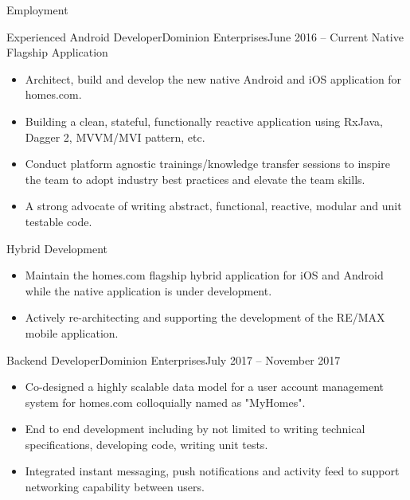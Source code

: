 \documentclass{mcdowellcv}
\begin{document}
	\makeheader
	
	\begin{cvsection}{Employment}
		\begin{cvsubsection}{Experienced Android Developer}{Dominion Enterprises}{June 2016 -- Current}
			Native Flagship Application
			\begin{itemize}
				\item Architect, build and develop the new native Android and iOS application for homes.com.
				\item Building a clean, stateful, functionally reactive application using RxJava, Dagger 2, MVVM/MVI pattern, etc.
				\item Conduct platform agnostic trainings/knowledge transfer sessions to inspire the team to adopt industry best practices and elevate the team skills.
				\item A strong advocate of writing abstract, functional, reactive, modular and unit testable code.
			\end{itemize}

			Hybrid Development
			\begin{itemize}
				\item Maintain the homes.com flagship hybrid application for iOS and Android while the native application is under development.
				\item Actively re-architecting and supporting the development of the RE/MAX mobile application.
			\end{itemize}
		\end{cvsubsection}
		
		\begin{cvsubsection}{Backend Developer}{Dominion Enterprises}{July 2017 -- November 2017}	
			\begin{itemize}
				\item Co-designed a highly scalable data model for a user account management system for homes.com colloquially named as "MyHomes".
				\item End to end development including by not limited to writing technical specifications, developing code, writing unit tests.
				\item Integrated instant messaging, push notifications and activity feed to support networking capability between users.
			\end{itemize}
		\end{cvsubsection}
		

\end{cvsection}
\end{document}
